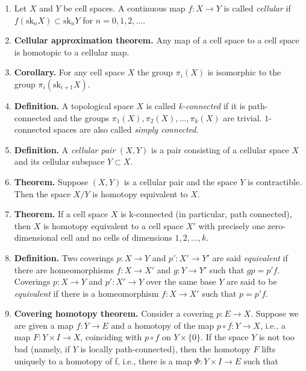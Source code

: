 \documentclass{article}
\newcommand{\sk}[2]{\text{sk}_{#1}#2}
\begin{document}
\begin{enumerate}
\item Let $X$ and $Y$ be cell spaces. A continuous map $f : X \to Y$
  is called \textit{cellular} if $f(\sk{n}{X}) \subset \sk{n}{Y}$ for $n
  = 0,1,2,...$.

\item \textbf{Cellular approximation theorem.} Any map of a cell space
  to a cell space is homotopic to a cellular map.

\item \textbf{Corollary.} For any cell space $X$ the group $\pi_i(X)$
  is isomorphic to the group $\pi_i(\sk{i+1}{X})$.

\item \textbf{Definition.} A topological space $X$ is called
  \textit{k-connected} if it is path-connected and the groups
  $\pi_1(X), \pi_2(X),\dots, \pi_k(X)$ are trivial. $1$-connected
  spaces are also called \textit{simply connected}.

\item \textbf{Definition.} A \textit{cellular pair} $(X,Y)$ is a pair
  consisting of a cellular space $X$ and its cellular subspace $Y
  \subset X$.

\item \textbf{Theorem.} Suppose $(X,Y)$ is a cellular pair and the
  space $Y$ is contractible. Then the space $X/Y$ is homotopy
  equivalent to $X$.

\item \textbf{Theorem.} If a cell space $X$ is k-connected (in
  particular, path connected), then $X$ is homotopy equivalent to a
  cell space $X'$ with precisely one zero-dimensional cell and no
  cells of dimensions $1,2,\dots,k$.

\item \textbf{Definition.} Two coverings $p : X \to Y$ and $p' : X'
  \to Y'$ are said \textit{equivalent} if there are homeomorphisms $f
  : X \to X'$ and $g : Y \to Y'$ such that $gp = p'f$. Coverings $p :
  X \to Y$ and $p' : X' \to Y$ over the same base $Y$ are said to be
  \textit{equivalent} if there is a homeomorphism $f : X \to X'$ such
  that $p = p'f$.

\item \textbf{Covering homotopy theorem.} Consider a covering $p : E
  \to X$. Suppose we are given a map $f : Y \to E$ and a homotopy of
  the map $p \circ f : Y \to X$, i.e., a map $F : Y \times I \to X$,
  coinciding with $p \circ f$ on $Y \times \{0\}$. If the space $Y$ is
  not too bad (namely, if $Y$ is locally path-connected), then the
  homotopy $F$ lifts uniquely to a homotopy of f, i.e., there is a map
  $\Phi : Y \times I \to E$ such that


\end{enumerate}
\end{document}
